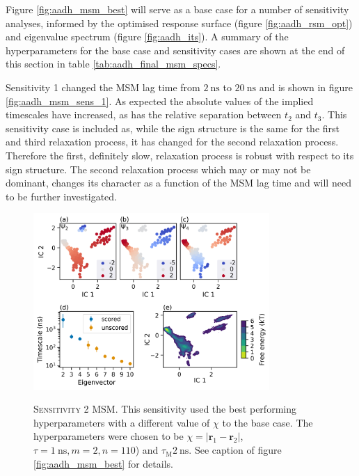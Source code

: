 Figure \ref{fig:aadh_msm_best} will serve as a base case for a number of sensitivity analyses, informed by the optimised response surface (figure \ref{fig:aadh_rsm_opt}) and eigenvalue spectrum (figure \ref{fig:aadh_its}). A summary of the hyperparameters for the base case and sensitivity cases are shown at the end of this section in table \ref{tab:aadh_final_msm_specs}. 

Sensitivity 1 changed the MSM lag time from $\SI{2}{\nano\second}$ to $\SI{20}{\nano\second}$ and is shown in figure \ref{fig:aadh_msm_sens_1}. As expected the absolute values of the implied timescales have increased, as has the relative separation between $t_{2}$ and $t_{3}$. 
This sensitivity case is included as,  while the sign structure is the same for the first and third relaxation process, it has changed for the second relaxation process.  Therefore the first, definitely slow, relaxation process is robust with respect to its sign structure. The second relaxation process which may or may not be dominant, changes its character as a function of the MSM lag time and will need to be further investigated. 

\begin{figure}
    \centering
    \caption[Sensitivity 2 MSM]{\textsc{Sensitivity 2 MSM}. This sensitivity used the best performing hyperparameters with a different value of $\chi$ to the base case. The hyperparameters were chosen to be $\chi= |\mathbf{r}_{1} - \mathbf{r}_{2}|$, $\tau = \SI{1}{\nano\second}, m=2, n=110$) and $\tau_{\mathrm{M}} \SI{2}{\nano\second}$. See caption of figure \ref{fig:aadh_msm_best} for details.}
    \includegraphics[width=0.8\textwidth]{chapters/msm_optimization/figures/aadh_msm_sens_2.png}
    \label{fig:aadh_msm_sens_2}
\end{figure}

